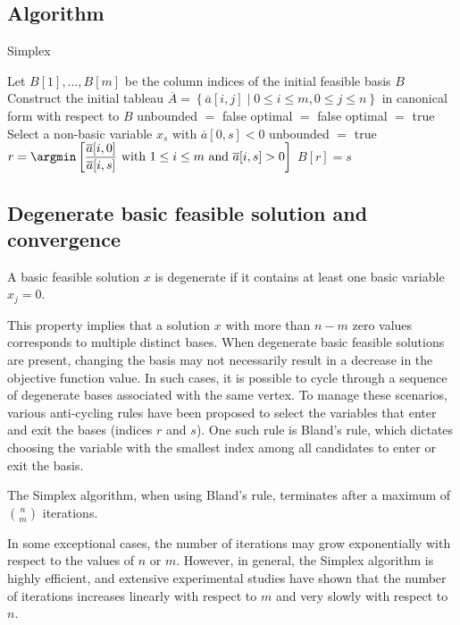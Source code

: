 \subsection{Algorithm}
\begin{algorithm}[H]
    \caption{Simplex}
        \begin{algorithmic}[1]
            \State Let $B[1],\dots,B[m]$ be the column indices of the initial feasible basis $B$
            \State Construct the initial tableau $\overline{A}=\left\{\overline{a}[i,j] \mid 0 \leq i \leq m, 0 \leq j \leq n\right\}$ in canonical form with respect to $B$
            \State unbounded $=$ false
            \State optimal $=$ false
                    \State optimal $=$ true
                \Else
                    \State Select a non-basic variable $x_s$ with $\overline{a}[0,s] < 0$
                        \State unbounded $=$ true
                    \Else 
                        \State $r = \argmin\left[ \dfrac{\overline{a}[i,0]}{\overline{a}[i,s]} \text{ with } 1 \leq i \leq m \text{ and } \overline{a}[i,s]>0\right]$
                        \State {}
                        \State $B[r] = s$
                    \EndIf
                \EndIf
            \EndWhile
        \end{algorithmic}
\end{algorithm}

\subsection{Degenerate basic feasible solution and convergence}
\begin{definition}
    A basic feasible solution $x$ is degenerate if it contains at least one basic variable $x_j=0$.
\end{definition}
This property implies that a solution $x$ with more than $n - m$ zero values corresponds to multiple distinct bases. 
When degenerate basic feasible solutions are present, changing the basis may not necessarily result in a decrease in the objective function value.
In such cases, it is possible to cycle through a sequence of degenerate bases associated with the same vertex.
To manage these scenarios, various anti-cycling rules have been proposed to select the variables that enter and exit the bases (indices $r$ and $s$). 
One such rule is Bland's rule, which dictates choosing the variable with the smallest index among all candidates to enter or exit the basis.
\begin{proposition}
    The Simplex algorithm, when using Bland's rule, terminates after a maximum of $\binom{n}{m}$ iterations.
\end{proposition}
In some exceptional cases, the number of iterations may grow exponentially with respect to the values of $n$ or $m$. 
However, in general, the Simplex algorithm is highly efficient, and extensive experimental studies have shown that the number of iterations increases linearly with respect to $m$ and very slowly with respect to $n$. 

